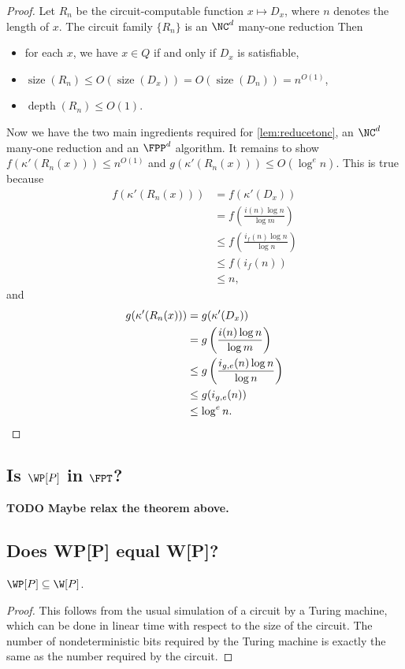 \documentclass{article}
\newcommand{\todo}[1]{\textbf{TODO #1}}
\DeclareMathOperator{\depth}{depth}
\DeclareMathOperator{\size}{size}
\begin{document}
\begin{proof}
  Let $R_n$ be the circuit-computable function $x \mapsto D_x$, where $n$ denotes the length of $x$.
  The circuit family $\{R_n\}$ is an $\NC^d$ many-one reduction
  Then
  \begin{itemize}
  \item for each $x$, we have $x \in Q$ if and only if $D_x$ is satisfiable,
  \item $\size(R_n) \leq O(\size(D_x)) = O(\size(D_n)) = n^{O(1)}$,
  \item $\depth(R_n) \leq O(1)$.
  \end{itemize}
  Now we have the two main ingredients required for \autoref{lem:reducetonc}, an $\NC^d$ many-one reduction and an $\FPP^d$ algorithm.
  It remains to show $f(\kappa'(R_n(x))) \leq n^{O(1)}$ and $g(\kappa'(R_n(x))) \leq O(\log^e n)$.
  This is true because
  \begin{align*}
    f(\kappa'(R_n(x))) & = f(\kappa'(D_x)) \\
    & = f\left(\frac{i(n) \log n}{\log m}\right) \\
    & \leq f\left(\frac{i_f(n) \log n}{\log n}\right) \\
    & \leq f(i_f(n)) \\
    & \leq n,
  \end{align*}
  and
  \begin{align*}
    g(\kappa'(R_n(x))) & = g(\kappa'(D_x)) \\
    & = g\left(\frac{i(n) \log n}{\log m}\right) \\
    & \leq g\left(\frac{i_{g, e}(n) \log n}{\log n}\right) \\
    & \leq g(i_{g, e}(n)) \\
    & \leq \log^e n. \qedhere
  \end{align*}
\end{proof}

\subsection{Is \texorpdfstring{$\WP[P]$}{WP[P]} in \texorpdfstring{$\FPT$}{FPT}?}

\todo{Maybe relax the theorem above.}

\subsection{Does WP[P] equal W[P]?}

\begin{theorem}
  $\WP[P] \subseteq \W[P]$.
\end{theorem}
\begin{proof}
  This follows from the usual simulation of a circuit by a Turing machine, which can be done in linear time with respect to the size of the circuit.
  The number of nondeterministic bits required by the Turing machine is exactly the same as the number required by the circuit.
\end{proof}
\end{document}
